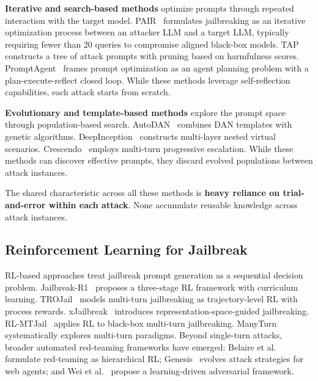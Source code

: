 \documentclass{article} %
\begin{document}
\textbf{Iterative and search-based methods} optimize prompts through repeated interaction with the target model. PAIR~\citep{chao2023pair} formulates jailbreaking as an iterative optimization process between an attacker LLM and a target LLM, typically requiring fewer than 20 queries to compromise aligned black-box models. TAP~\citep{mehrotra2023tap} constructs a tree of attack prompts with pruning based on harmfulness scores. PromptAgent~\citep{wang2024promptagent} frames prompt optimization as an agent planning problem with a plan-execute-reflect closed loop. While these methods leverage self-reflection capabilities, each attack starts from scratch.

\textbf{Evolutionary and template-based methods} explore the prompt space through population-based search. AutoDAN~\citep{liu2023autodan} combines DAN templates with genetic algorithms. DeepInception~\citep{li2023deepinception} constructs multi-layer nested virtual scenarios. Crescendo~\citep{russinovich2024crescendo} employs multi-turn progressive escalation. While these methods can discover effective prompts, they discard evolved populations between attack instances.

The shared characteristic across all these methods is \textbf{heavy reliance on trial-and-error within each attack}. None accumulate reusable knowledge across attack instances.

\subsection{Reinforcement Learning for Jailbreak}

RL-based approaches treat jailbreak prompt generation as a sequential decision problem. Jailbreak-R1~\citep{guo2025jailbreakr1} proposes a three-stage RL framework with curriculum learning. TROJail~\citep{xiong2026trojail} models multi-turn jailbreaking as trajectory-level RL with process rewards. xJailbreak~\citep{lee2025xjailbreak} introduces representation-space-guided jailbreaking. RL-MTJail~\citep{chen2025rlmtjail} applies RL to black-box multi-turn jailbreaking. ManyTurn~\citep{yang2025manyturn} systematically explores multi-turn paradigms. Beyond single-turn attacks, broader automated red-teaming frameworks have emerged: Belaire et al.~\citep{belaire2025automatic} formulate red-teaming as hierarchical RL; Genesis~\citep{zhang2025genesis} evolves attack strategies for web agents; and Wei et al.~\citep{wei2025learning} propose a learning-driven adversarial framework.
\end{document}
